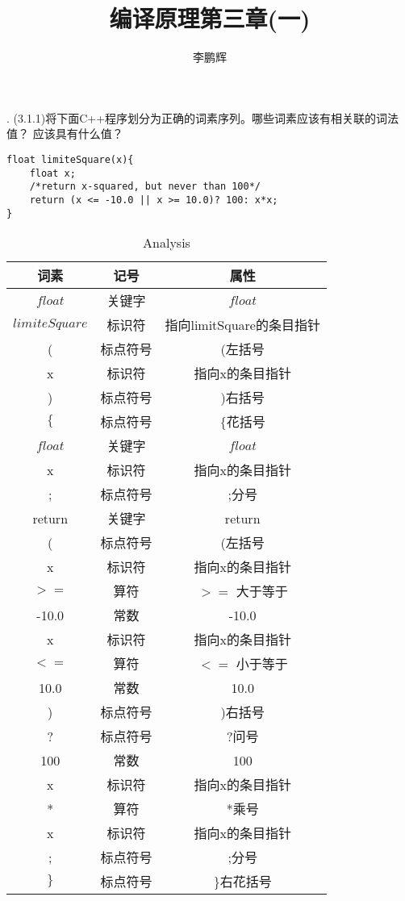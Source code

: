 \documentclass[a4paper, 16pt]{article}
\title{编译原理第三章(一)}
\author{李鹏辉}
\begin{document}
. (3.1.1)将下面C++程序划分为正确的词素序列。哪些词素应该有相关联的词法值？ 应该具有什么值？\\

\lstset{language=C}
\begin{lstlisting}
float limiteSquare(x){
	float x;
	/*return x-squared, but never than 100*/
	return (x <= -10.0 || x >= 10.0)? 100: x*x;
}
\end{lstlisting}
\begin{table}[H]
\centering
\caption{Analysis}
\begin{tabular}{c|c|c}
\hline
词素 & 记号 & 属性\\
\hline
$float$ & 关键字 & $float$\\
\hline
$limiteSquare$ &标识符 &指向limitSquare的条目指针\\
\hline
( & 标点符号 & (左括号 \\
\hline
x & 标识符 & 指向x的条目指针\\
\hline
) & 标点符号 & )右括号 \\
\hline
$\{$ & 标点符号 &$\{ $花括号\\
\hline
$float$ & 关键字 & $float$\\
\hline
x & 标识符 & 指向x的条目指针\\
\hline
; & 标点符号 & ;分号\\
\hline
return & 关键字 & return \\
\hline
( & 标点符号 & (左括号 \\
\hline
x & 标识符 & 指向x的条目指针\\
\hline
$>= $& 算符 & $>=$ 大于等于\\
\hline
-10.0 &常数 & -10.0\\
\hline
x & 标识符 & 指向x的条目指针\\
\hline
$<=$ & 算符 & $<=$ 小于等于 \\
\hline
10.0 &常数 & 10.0\\
\hline
) & 标点符号 & )右括号 \\
\hline
? & 标点符号& ?问号 \\
\hline
100 & 常数 & 100\\
\hline
x & 标识符 & 指向x的条目指针\\
\hline
* & 算符 & *乘号\\
\hline
x & 标识符 & 指向x的条目指针\\
\hline
; & 标点符号 & ;分号\\
\hline
$\}$ & 标点符号 &$\}$右花括号\\
\hline
\end{tabular}
\end{table}
\end{document}
